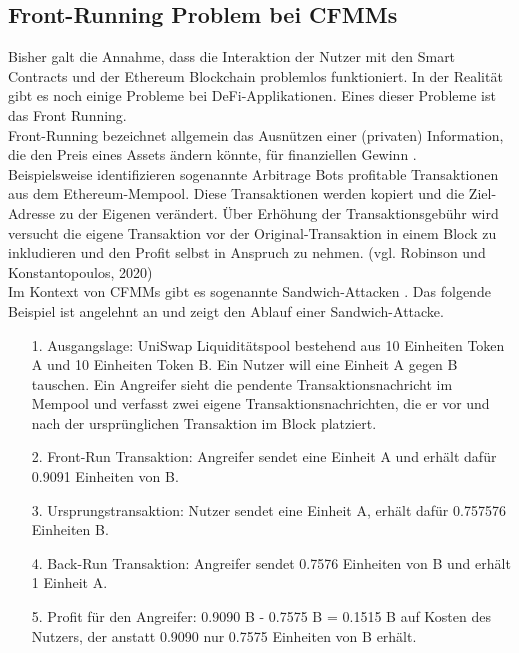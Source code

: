 \documentclass[12pt,a4paper,titlepage,oneside,english]{article}
\begin{document}

\subsection{Front-Running Problem bei CFMMs}
Bisher galt die Annahme, dass die Interaktion der Nutzer mit den Smart Contracts und der Ethereum Blockchain problemlos funktioniert. In der Realität gibt es noch einige Probleme bei DeFi-Applikationen. Eines dieser Probleme ist das \glqq Front Running\grqq .\\
Front-Running bezeichnet allgemein das Ausnützen einer (privaten) Information, die den Preis eines Assets ändern könnte, für finanziellen Gewinn \citep[S.1]{Zhou2020}.\\
Beispielsweise identifizieren sogenannte Arbitrage Bots profitable Transaktionen aus dem Ethereum-Mempool. Diese Transaktionen werden kopiert und die Ziel-Adresse zu der Eigenen verändert. Über Erhöhung der Transaktionsgebühr wird versucht die eigene Transaktion vor der Original-Transaktion in einem Block zu inkludieren und den Profit selbst in Anspruch zu nehmen. (vgl. Robinson und Konstantopoulos, 2020) \\
Im Kontext von CFMMs gibt es sogenannte Sandwich-Attacken \citep{Zhou2020a}. Das folgende Beispiel ist angelehnt an \citet{Buterin2018} und zeigt den Ablauf einer Sandwich-Attacke. %
\begin{itemize} \item[1.] Ausgangslage: UniSwap Liquiditätspool bestehend aus 10 Einheiten Token A und 10 Einheiten Token B.  Ein Nutzer will eine Einheit A gegen B tauschen. Ein Angreifer sieht die pendente Transaktionsnachricht im Mempool und verfasst zwei eigene Transaktionsnachrichten, die er vor und nach der ursprünglichen Transaktion im Block platziert.
	\item[2.] Front-Run Transaktion: Angreifer sendet eine Einheit A und erhält dafür 0.9091 Einheiten von B.
	\item[3.] Ursprungstransaktion: Nutzer sendet eine Einheit A, erhält dafür 0.757576 Einheiten B.
	\item[4.] Back-Run Transaktion: Angreifer sendet 0.7576 Einheiten von B und erhält 1 Einheit A.	
	\item[5.] Profit für den Angreifer: 0.9090 B - 0.7575 B = 0.1515 B auf Kosten des Nutzers, der anstatt 0.9090 nur 0.7575 Einheiten von B erhält.
\end{itemize}
\end{document}
